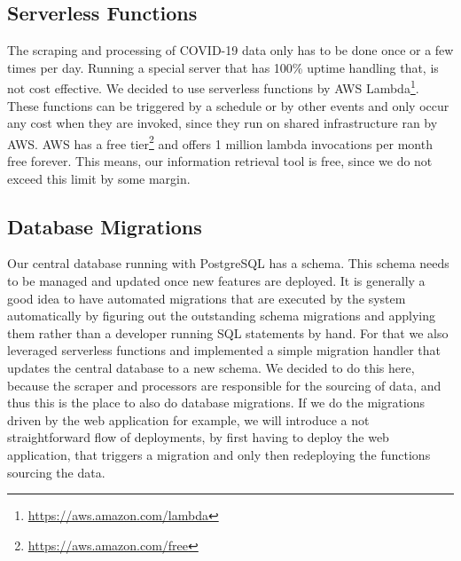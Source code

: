 \subsection{Serverless Functions}

The scraping and processing of COVID-19 data only has to be done once or a few times per day. Running a special server that has 100\% uptime handling that, is not cost effective. We decided to use serverless functions by AWS Lambda\footnote{\href{https://aws.amazon.com/lambda}{https://aws.amazon.com/lambda}}. These functions can be triggered by a schedule or by other events and only occur any cost when they are invoked, since they run on shared infrastructure ran by AWS. AWS has a free tier\footnote{\href{https://aws.amazon.com/free}{https://aws.amazon.com/free}} and offers 1 million lambda invocations per month free forever. This means, our information retrieval tool is free, since we do not exceed this limit by some margin.

\subsection{Database Migrations}

Our central database running with PostgreSQL has a schema. This schema needs to be managed and updated once new features are deployed. It is generally a good idea to have automated migrations that are executed by the system automatically by figuring out the outstanding schema migrations and applying them rather than a developer running SQL statements by hand. For that we also leveraged serverless functions and implemented a simple migration handler that updates the central database to a new schema. We decided to do this here, because the scraper and processors are responsible for the sourcing of data, and thus this is the place to also do database migrations. If we do the migrations driven by the web application for example, we will introduce a not straightforward flow of deployments, by first having to deploy the web application, that triggers a migration and only then redeploying the functions sourcing the data.
